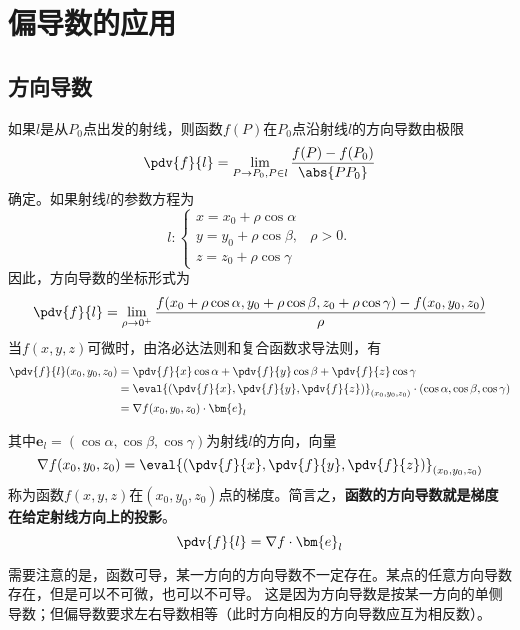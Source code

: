 \section{偏导数的应用}
\subsection{方向导数}
如果$l$是从$P_0$点出发的射线，则函数$f(P)$在$P_0$点沿射线$l$的方向导数由极限
\begin{equation}
    \pdv{f}{l} = \lim_{P\to P_0,P\in l}\frac{f(P)-f(P_0)}{\abs{PP_0}}
\end{equation}
确定。如果射线$l$的参数方程为
\[
    l:
    \begin{cases}
        x = x_0 + \rho\cos\alpha &          \\
        y = y_0 + \rho\cos\beta, & \rho >0. \\
        z = z_0 + \rho\cos\gamma &
    \end{cases}
\]
因此，方向导数的坐标形式为
\begin{equation}
    \pdv{f}{l} = \lim_{\rho\to 0^+}\frac{f(x_0 + \rho\cos\alpha,y_0 + \rho\cos\beta,z_0 + \rho\cos\gamma)-f(x_0,y_0,z_0)}{\rho}
\end{equation}
当$f(x,y,z)$可微时，由洛必达法则和复合函数求导法则，有
\begin{align*}
    \pdv{f}{l}(x_0,y_0,z_0)
     & = \pdv{f}{x}\cos\alpha + \pdv{f}{y}\cos\beta + \pdv{f}{z}\cos\gamma                                          \\
     & = \eval{\left(\pdv{f}{x},\pdv{f}{y},\pdv{f}{z}\right)}_{(x_0,y_0,z_0)}\cdot(\cos\alpha,\cos\beta,\cos\gamma) \\
     & = \nabla f(x_0,y_0,z_0)\cdot \bm{e}_l
\end{align*}

其中$\bm{e}_l=(\cos\alpha,\cos\beta,\cos\gamma)$为射线$l$的方向，向量
\begin{equation}
    \nabla f(x_0,y_0,z_0)=\eval{\left(\pdv{f}{x},\pdv{f}{y},\pdv{f}{z}\right)}_{(x_0,y_0,z_0)}
\end{equation}
称为函数$f(x,y,z)$在$(x_0,y_0,z_0)$点的梯度。简言之，\textbf{\textsf{函数的方向导数就是梯度在给定射线方向上的投影}}。
\begin{equation}
    \pdv{f}{l} = \nabla f\cdot \bm{e}_l
\end{equation}

需要注意的是，函数可导，某一方向的方向导数不一定存在。某点的任意方向导数存在，但是可以不可微，也可以不可导。
这是因为方向导数是按某一方向的单侧导数；但偏导数要求左右导数相等（此时方向相反的方向导数应互为相反数）。


